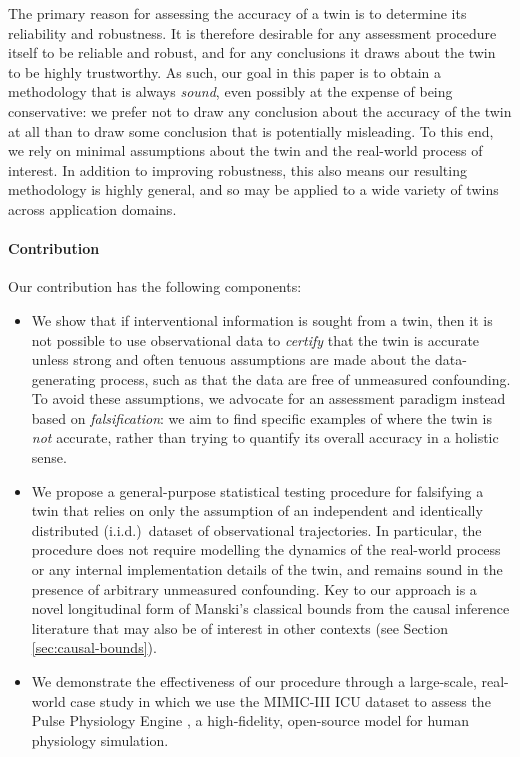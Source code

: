The primary reason for assessing the accuracy of a twin is to determine its reliability and robustness.
It is therefore desirable for any assessment procedure itself to be reliable and robust, and for any conclusions it draws about the twin to be highly trustworthy.
%
%
As such, our goal in this paper is to obtain a methodology that is always \emph{sound}, even possibly at the expense of being conservative: we prefer not to draw any conclusion about the accuracy of the twin at all than to draw some conclusion that is potentially misleading.
To this end, we rely on minimal assumptions about the twin and the real-world process of interest.
In addition to improving robustness, this also means our resulting methodology is highly general, and so may be applied to a wide variety of twins across application domains.

%

%
%
%
%


%
%
%
%
%
%

\paragraph{Contribution}

Our contribution has the following components:
\begin{itemize}
    \item We show that if interventional information is sought from a twin, then it is not possible to use observational data to \emph{certify} that the twin is accurate unless strong and often tenuous assumptions are made about the data-generating process, such as that the data are free of unmeasured confounding.
    To avoid these assumptions, we advocate for an assessment paradigm instead based on \emph{falsification}: we aim to find specific examples of where the twin is \emph{not} accurate, rather than trying to quantify its overall accuracy in a holistic sense. %
    \item We propose a general-purpose statistical testing procedure for falsifying a twin that relies on only the assumption of an independent and identically distributed (i.i.d.)\ dataset of observational trajectories.
    In particular, the procedure does not require modelling the dynamics of the real-world process or any internal implementation details of the twin, and remains sound in the presence of arbitrary unmeasured confounding. %
    Key to our approach is a novel longitudinal form of Manski's classical bounds \cite{manski} from the causal inference literature that may also be of interest in other contexts (see Section \ref{sec:causal-bounds}).
    \item We demonstrate the effectiveness of our procedure through a large-scale, real-world case study in which we use the MIMIC-III ICU dataset \cite{mimic} to assess the Pulse Physiology Engine \cite{pulse}, a high-fidelity, open-source model for human physiology simulation.
\end{itemize}

